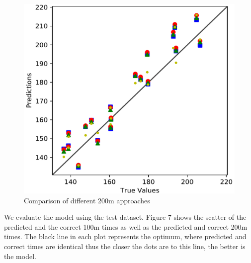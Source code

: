 \begin{figure}[ht]
\begin{minipage}{0.38\textwidth}
\includegraphics[width=\textwidth]{visualisation/eval_200m_variations.png}
\end{minipage}
\caption{Comparison of different 200m approaches}
\label{fig:200m_variations}
\end{figure}
We evaluate the model using the test dataset. Figure 7 shows the scatter of the predicted and the correct 100m times as well as the predicted and correct 200m times. The black line in each plot represents the optimum, where predicted and correct times are identical thus the closer the dots are to this line, the better is the model.\\
